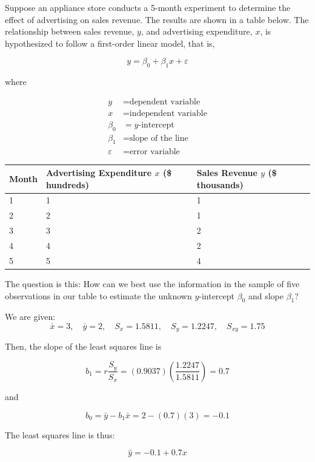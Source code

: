 \begin{example}
Suppose an appliance store conducts a 5-month experiment to determine the effect of advertising on sales revenue. The results are shown in a table below. The relationship between sales revenue, $y$, and advertising expenditure, $x$, is hypothesized to follow a first-order linear model, that is,

\[
y = \beta_0 + \beta_1 x + \varepsilon
\]

where

\begin{align*}
y & = \text{dependent variable} \\
x & = \text{independent variable} \\
\beta_0 & = \text{$y$-intercept} \\
\beta_1 & = \text{slope of the line} \\
\varepsilon & = \text{error variable}
\end{align*}


\begin{table}[H]
\centering
\small
\renewcommand{\arraystretch}{1.2}
\setlength{\tabcolsep}{4pt} %
\begin{tabular}{p{1.5cm} p{3cm} p{3cm}}
\toprule
\textbf{Month} &
\shortstack{\textbf{Advertising} \\ \textbf{Expenditure} \\ $x$ (\$ hundreds)} &
\shortstack{\textbf{Sales} \\ \textbf{Revenue} \\ $y$ (\$ thousands)} \\
\midrule
1 & 1 & 1 \\
2 & 2 & 1 \\
3 & 3 & 2 \\
4 & 4 & 2 \\
5 & 5 & 4 \\
\bottomrule
\end{tabular}
\end{table}



The question is this: How can we best use the information in the sample of five observations in our table to estimate the unknown $y$-intercept $\beta_0$ and slope $\beta_1$?

\vspace{1em}

We are given:
\[
\bar{x} = 3, \quad \bar{y} = 2, \quad S_x = 1.5811, \quad S_y = 1.2247, \quad S_{xy} = 1.75
\]

Then, the slope of the least squares line is

\[
b_1 = r \frac{S_y}{S_x} = (0.9037) \left( \frac{1.2247}{1.5811} \right) = 0.7
\]

and

\[
b_0 = \bar{y} - b_1 \bar{x} = 2 - (0.7)(3) = -0.1
\]

The least squares line is thus:

\[
\hat{y} = -0.1 + 0.7x
\]
\end{example}

